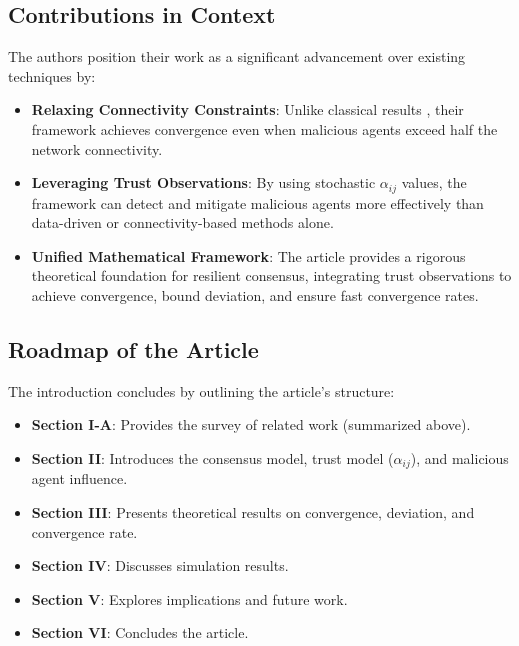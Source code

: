 \documentclass{article}
\begin{document}
\subsection*{Contributions in Context}
The authors position their work as a significant advancement over existing techniques by:
\begin{itemize}
    \item \textbf{Relaxing Connectivity Constraints}: Unlike classical results \cite{ref1}, their framework achieves convergence even when malicious agents exceed half the network connectivity.
    \item \textbf{Leveraging Trust Observations}: By using stochastic $\alpha_{ij}$ values, the framework can detect and mitigate malicious agents more effectively than data-driven or connectivity-based methods alone.
    \item \textbf{Unified Mathematical Framework}: The article provides a rigorous theoretical foundation for resilient consensus, integrating trust observations to achieve convergence, bound deviation, and ensure fast convergence rates.
\end{itemize}

\subsection*{Roadmap of the Article}
The introduction concludes by outlining the article's structure:
\begin{itemize}
    \item \textbf{Section I-A}: Provides the survey of related work (summarized above).
    \item \textbf{Section II}: Introduces the consensus model, trust model ($\alpha_{ij}$), and malicious agent influence.
    \item \textbf{Section III}: Presents theoretical results on convergence, deviation, and convergence rate.
    \item \textbf{Section IV}: Discusses simulation results.
    \item \textbf{Section V}: Explores implications and future work.
    \item \textbf{Section VI}: Concludes the article.
\end{itemize}
\end{document}
